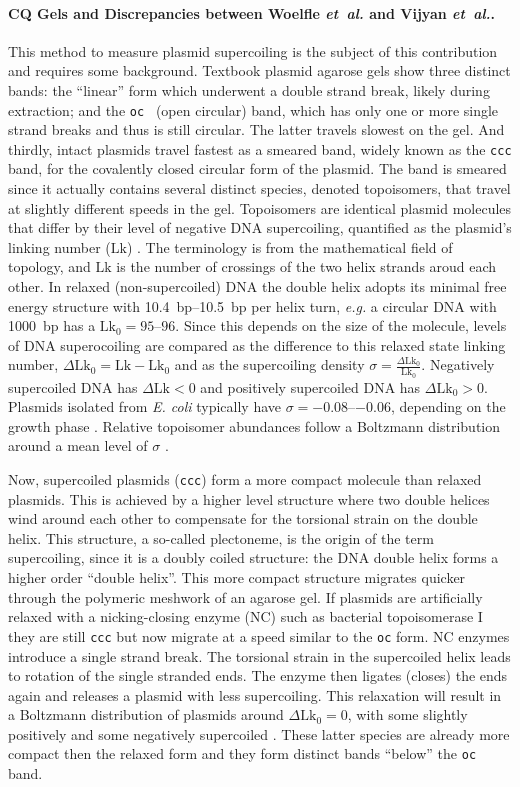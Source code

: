 \documentclass[10pt,a4]{article}
\newcommand{\lk}{\ensuremath{\text{Lk}}}
\newcommand{\lkr}{\ensuremath{\text{Lk}_0}}
\newcommand{\dlk}{\ensuremath{\Delta\text{Lk}}}
\newcommand{\dlkr}{\ensuremath{\Delta\text{Lk}_0}}
\newcommand{\etal}{\textit{et~al.}}
\newcommand{\eg}{\textit{e.g.}}
\begin{document}
\paragraph{CQ Gels and Discrepancies between Woelfle \etal{} and Vijyan \etal{}.}
This method to measure plasmid supercoiling is the subject of this
contribution and requires some background.  Textbook plasmid agarose
gels show three distinct bands: the ``linear'' form which underwent a
double strand break, likely during extraction; and the \texttt{oc }
(open circular) band, which has only one or more single strand breaks
and thus is still circular. The latter travels slowest on the gel. And
thirdly, intact plasmids travel fastest as a smeared band, widely
known as the \texttt{ccc} band, for the covalently closed circular
form of the plasmid. The band is smeared since it actually contains
several distinct species, denoted topoisomers, that travel at slightly
different speeds in the gel.
%
Topoisomers are identical plasmid molecules that differ by their level
of negative DNA supercoiling, quantified as the plasmid's linking
number (\lk{}) \cite{Crick1976}. The terminology is from the
mathematical field of topology, and \lk{} is the number of crossings
of the two helix strands aroud each other.  In relaxed
(non-supercoiled) DNA the double helix adopts its minimal free energy
structure with \SIrange{10.4}{10.5}{bp} per helix turn, \eg{} a
circular DNA with \SI{1000}{bp} has a $\lkr=\numrange{95}{96}$. Since
this depends on the size of the molecule, levels of DNA superocoiling
are compared as the difference to this relaxed state linking number,
$\dlkr=\lk-\lkr$ and as the supercoiling density
$\sigma=\frac{\dlkr}{\lkr}$.  Negatively supercoiled DNA has $\dlk<0$
and positively supercoiled DNA has $\dlkr>0$.  Plasmids isolated from
\textit{E. coli} typically have $\sigma=\numrange{-0.08}{-0.06}$,
depending on the growth phase \cite{Liu2018}. Relative topoisomer
abundances follow a Boltzmann distribution around a mean level of
$\sigma$ \cite{Pulleyblank1975, Depew1975, Keller1975b}.

Now, supercoiled plasmids (\texttt{ccc}) form a more compact molecule than
relaxed plasmids. This is achieved by a higher level structure where
two double helices wind around each other to compensate for the
torsional strain on the double helix. This structure, a so-called
plectoneme, is the origin of the term supercoiling, since it is a
doubly coiled structure: the DNA double helix forms a higher order
``double helix''. This more compact structure migrates quicker through
the polymeric meshwork of an agarose gel.
%
If plasmids are artificially relaxed with a nicking-closing enzyme
(NC) such as bacterial topoisomerase I they are still \texttt{ccc} but
now migrate at a speed similar to the \texttt{oc} form. NC enzymes
introduce a single strand break. The torsional strain in the
supercoiled helix leads to rotation of the single stranded ends. The
enzyme then ligates (closes) the ends again and releases a plasmid
with less supercoiling. This relaxation will result in a Boltzmann
distribution of plasmids around $\dlkr=0$, with some slightly
positively and some negatively supercoiled \cite{Depew1975}.  These
latter species are already more compact then the relaxed form and they
form distinct bands ``below'' the \texttt{oc} band.
\end{document}
